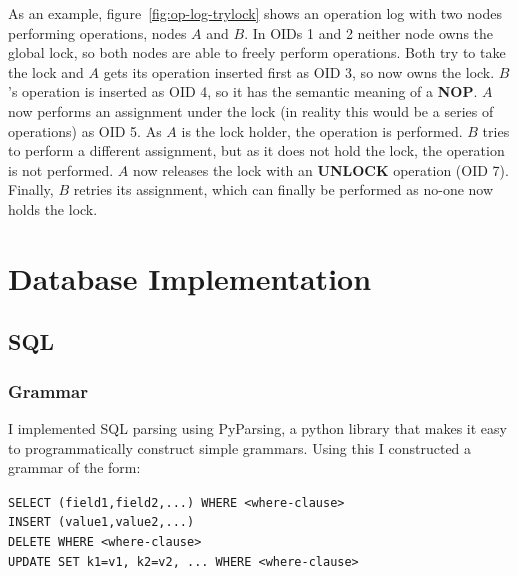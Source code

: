 \documentclass[12pt,twoside,notitlepage]{report}
\newcommand{\op}[1]  {{\bf #1}}         %
\begin{document}
As an example, figure~\ref{fig:op-log-trylock} shows an operation log with two nodes
performing operations, nodes $A$ and $B$. In OIDs 1 and 2 neither node owns the global lock, so both
nodes are able to freely perform operations. Both try to take the lock and $A$ gets its operation
inserted first as OID 3, so now owns the lock. $B$'s operation is inserted as OID 4, so it has the
semantic meaning of a \op{NOP}. $A$ now performs an assignment under the lock (in reality this
would be a series of operations) as OID 5. As $A$ is the lock holder, the operation is performed.
$B$ tries to perform a different assignment, but as it does not hold the lock, the operation is
not performed. $A$ now releases the lock with an \op{UNLOCK} operation (OID 7). Finally, $B$
retries its assignment, which can finally be performed as no-one now holds the lock.

%
%
%
%

\section{Database Implementation}

\subsection{SQL}

\subsubsection{Grammar}

I implemented SQL parsing using PyParsing, a python library that makes it easy to programmatically
construct simple grammars. Using this I constructed a grammar of the form:

\verb+SELECT (field1,field2,...) WHERE <where-clause>+ \\
\verb+INSERT (value1,value2,...)+ \\
\verb+DELETE WHERE <where-clause>+ \\
\verb+UPDATE SET k1=v1, k2=v2, ... WHERE <where-clause>+ \\
\end{document}
